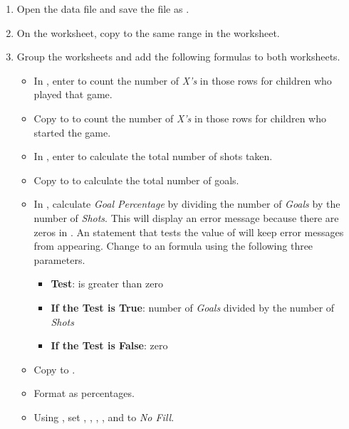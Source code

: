 \begin{enumbox}
	\begin{enumerate}
		\item Open the data file  and save the file as .
		\item On the  worksheet, copy  to the same range in the  worksheet.
		\item Group the worksheets and add the following formulas to both worksheets.
	
		\begin{itemize}
			\item In , enter  to count the number of \textit{X's} in those rows for children who played that game.
			\item Copy  to  to count the number of \textit{X's} in those rows for children who started the game.
			\item In , enter  to calculate the total number of shots taken. 
			\item Copy  to  to calculate the total number of goals.
			\item In , calculate \textit{Goal Percentage} by dividing the number of \textit{Goals} by the number of \textit{Shots}. This will display an error message because there are zeros in . An  statement that tests the value of  will keep error messages from appearing. Change  to an  formula using the following three parameters.
			\begin{itemize}
				\item \textbf{Test}: is  greater than zero
				\item \textbf{If the Test is True}: number of \textit{Goals} divided by the number of \textit{Shots}
				\item \textbf{If the Test is False}: zero
			\end{itemize}
			\item Copy  to .
			\item Format  as percentages.
			\item Using , set , , , , and  to \textit{No Fill}. 
			\end{itemize}	
		

\end{enumerate}
\end{enumbox}
